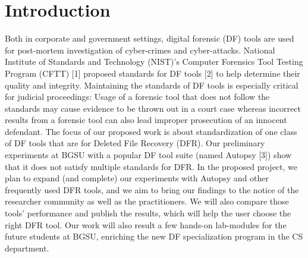 
\section{Introduction}

Both in corporate and government settings, digital forensic (DF) tools are used for post-mortem investigation of cyber-crimes and cyber-attacks. National Institute of Standards and Technology (NIST)’s Computer Forensics Tool Testing Program (CFTT) [1] proposed standards for DF tools [2] to help determine their quality and integrity. Maintaining the standards of DF tools is especially critical for judicial proceedings: Usage of a forensic tool that does not follow the standards may cause evidence to be thrown out in a court case whereas incorrect results from a forensic tool can also lead improper prosecution of an innocent defendant. The focus of our proposed work is about standardization of one class of DF tools that are for Deleted File Recovery (DFR). Our preliminary experiments at BGSU with a popular DF tool suite (named Autopsy [3]) show that it does not satisfy multiple standards for DFR. In the proposed project, we plan to expand (and complete) our experiments with Autopsy and other frequently used DFR tools, and we aim to bring our findings to the notice of the researcher community as well as the practitioners. We will also compare those tools’ performance and publish the results, which will help the user choose the right DFR tool. Our work will also result a few hands-on lab-modules for the future students at BGSU, enriching the new DF specialization program in the CS department.

